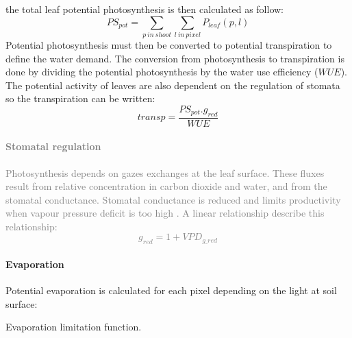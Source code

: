 the total leaf potential photosynthesis is then calculated as follow:
\begin{equation}\label{eq:PS_pot}
PS_{pot} = \sum_{p\ in\ shoot}\sum_{l\ in\ pixel}P_{leaf}(p,l)
\end{equation}
\indent Potential photosynthesis must then be converted to potential transpiration to define the water demand. The conversion from photosynthesis to transpiration is done by dividing the potential photosynthesis by the water use efficiency ($WUE$). The potential activity of leaves are also dependent on the regulation of stomata so the transpiration can be written:
\begin{equation}
transp = \frac{PS_{pot} . g_{red}}{WUE}
\end{equation}

\textcolor{Gray}{\paragraph{Stomatal regulation} Photosynthesis depends on gazes exchanges at the leaf surface. These fluxes result from relative concentration in carbon dioxide and water, and from the stomatal conductance. Stomatal conductance is reduced and limits productivity when vapour pressure deficit is too high . A linear relationship describe this relationship:
\begin{equation}
g_{red} = 1+ VPD_{g\_red}
\end{equation}}

\paragraph{Evaporation} Potential evaporation is calculated for each pixel depending on the light at soil surface:

\begin{marginfigure}
\label{fig:derivaives}
\caption{Evaporation  limitation function.}
\end{marginfigure}

